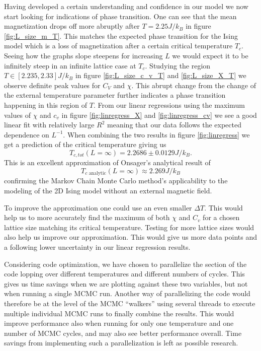 \documentclass[english,notitlepage,reprint,nofootinbib]{revtex4-1}  %
\begin{document}
Having developed a certain understanding and confidence in our model we now start looking for indications of phase transition. One can see that the mean magnetization drops off more abruptly after $T=2.25 J/k_B$ in figure \ref{fig:L_size_m_T}. This matches the expected phase transition for the Ising model which is a loss of magnetization after a certain critical temperature $T_c$. Seeing how the graphs slope steepens for increasing $L$ we would expect it to be infinitely steep in an infinite lattice case at $T_c$. Studying the region $T \in [2.235,2.33]J/k_B$ in figure \ref{fig:L_size_c_v_T} and \ref{fig:L_size_X_T} we observe definite peak values for $C_V$ and $\chi$. This abrupt change from the change of the external temperature parameter further indicates a phase transition happening in this region of $T$. From our linear regressions using the maximum values of $\chi$ and $c_v$ in figure \ref{fig:linregress_X} and \ref{fig:linregress_cv} we see a good linear fit with relatively large $R^2$ meaning that our data follows the expected dependence on $L^{-1}$. When combining the two results in figure  \ref{fig:linregress} we get a prediction of the critical temperature giving us
\begin{equation}
    T_{c,tot}(L=\infty) = 2.2686 \pm 0.0129  J/k_B.
\end{equation}
This is an excellent approximation of Onsager's analytical result of
\begin{equation}
    T_{c \text{ analytic}}(L=\infty) \approx 2.269 J/k_B
\end{equation}
confirming the Markov Chain Monte Carlo method's applicability to the modeling of the 2D Ising model without an external magnetic field.

To improve the approximation one could use an even smaller $\Delta T$. This would help us to more accurately find the maximum of both $\chi$ and $C_v$ for a chosen lattice size matching its critical temperature. Testing for more lattice sizes would also help us improve our approximation. This would give us more data points and a following lower uncertainty in our linear regression results.

Considering code optimization, we have chosen to parallelize the section of the code lopping over different temperatures and different numbers of cycles. This gives us time savings when we are plotting against these two variables, but not when running a single MCMC run. Another way of parallelizing the code would therefore be at the level of the MCMC ``walkers'' using several threads to execute multiple individual MCMC runs to finally combine the results. This would improve performance also when running for only one temperature and one number of MCMC cycles, and may also see better performance overall. Time savings from implementing such a parallelization is left as possible research.
\end{document}
